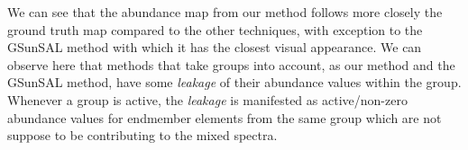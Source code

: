 \documentclass{article}
\begin{document}
We can see that the abundance map from our method follows more closely the ground truth map compared to the other techniques, with exception to the GSunSAL method with which it has the closest visual appearance. We can observe here that methods that take groups into account, as our method and the GSunSAL method, have some  \textit{leakage} of their abundance values within the group. Whenever a group is active, the \textit{leakage} is manifested as active/non-zero abundance values for endmember elements from the same group which are not suppose to be contributing to the mixed spectra.   
\begin{table}[h!]
 \centering
    \caption{SRE values for 4 synthetic data cubes}
	\small
\end{table}
\end{document}
